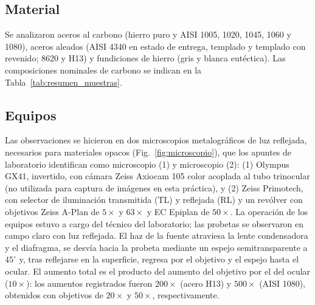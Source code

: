 \documentclass[journal,11pt]{IEEEtran}
\begin{document}
\subsection{Material}
Se analizaron aceros al carbono (hierro puro y AISI 1005, 1020, 1045, 1060 y 1080), aceros aleados (AISI 4340 en estado de entrega, templado y templado con revenido; 8620 y H13) y fundiciones de hierro (gris y blanca eutéctica). Las composiciones nominales de carbono se indican en la Tabla~\ref{tab:resumen_muestras}.

\subsection{Equipos}
Las observaciones se hicieron en dos microscopios metalográficos de luz reflejada, necesarios para materiales opacos (Fig.~\ref{fig:microscopio}), que los apuntes de laboratorio identifican como microscopio (1) y microscopio (2): (1) Olympus GX41, invertido, con cámara Zeiss Axiocam 105 color acoplada al tubo trinocular (no utilizada para captura de imágenes en esta práctica), y (2) Zeiss Primotech, con selector de iluminación transmitida (TL) y reflejada (RL) y un revólver con objetivos Zeiss A-Plan de $5\times$ y $63\times$ y EC Epiplan de $50\times$. La operación de los equipos estuvo a cargo del técnico del laboratorio; las probetas se observaron en campo claro con luz reflejada.
El haz de la fuente atraviesa la lente condensadora y el diafragma, se desvía hacia la probeta mediante un espejo semitransparente a $45^{\circ}$ y, tras reflejarse en la superficie, regresa por el objetivo y el espejo hasta el ocular. El aumento total es el producto del aumento del objetivo por el del ocular ($10\times$): los aumentos registrados fueron $200\times$ (acero H13) y $500\times$ (AISI 1080), obtenidos con objetivos de $20\times$ y $50\times$, respectivamente.
\end{document}
